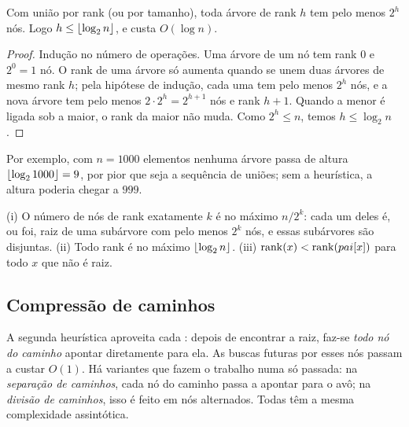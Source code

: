 \begin{teo}\label{teo:ufaltura}
Com união por rank (ou por tamanho), toda árvore de rank $h$ tem pelo menos $2^h$ nós. Logo $h\le\lfloor\log_2 n\rfloor$, e \Find{} custa $O(\log n)$.
\end{teo}
\begin{proof}
Indução no número de operações. Uma árvore de um nó tem rank 0 e $2^0=1$ nó. O rank de uma árvore só aumenta quando se unem duas árvores de mesmo rank $h$; pela hipótese de indução, cada uma tem pelo menos $2^h$ nós, e a nova árvore tem pelo menos $2\cdot2^h=2^{h+1}$ nós e rank $h+1$. Quando a menor é ligada sob a maior, o rank da maior não muda. Como $2^h\le n$, temos $h\le\log_2n$.
\end{proof}
Por exemplo, com $n=1000$ elementos nenhuma árvore passa de altura $\lfloor\log_21000\rfloor=9$, por pior que seja a sequência de uniões; sem a heurística, a altura poderia chegar a $999$.

\begin{cor}
(i) O número de nós de rank exatamente $k$ é no máximo $n/2^k$: cada um deles é, ou foi, raiz de uma subárvore com pelo menos $2^k$ nós, e essas subárvores são disjuntas. (ii) Todo rank é no máximo $\lfloor\log_2n\rfloor$. (iii) $\operatorname{rank}(x)<\operatorname{rank}(pai[x])$ para todo $x$ que não é raiz.
\end{cor}

\subsection*{Compressão de caminhos}
A segunda heurística aproveita cada \Find: depois de encontrar a raiz, faz-se \emph{todo nó do caminho} apontar diretamente para ela. As buscas futuras por esses nós passam a custar $O(1)$. Há variantes que fazem o trabalho numa só passada: na \emph{separação de caminhos}, cada nó do caminho passa a apontar para o avô; na \emph{divisão de caminhos}, isso é feito em nós alternados. Todas têm a mesma complexidade assintótica.

